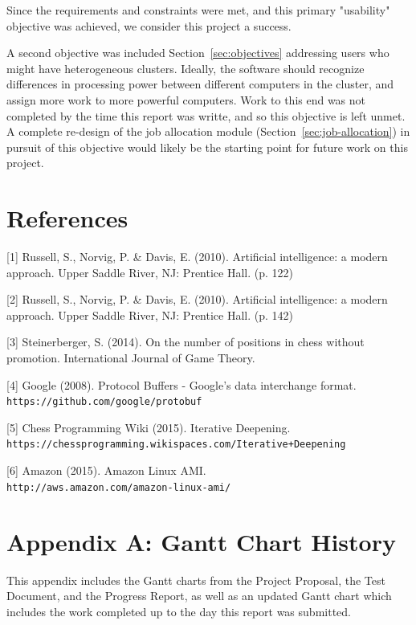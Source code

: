 \documentclass[pdftex,12pt,a4paper]{article}
\begin{document}
Since the requirements and constraints were met, and this primary "usability" objective was achieved, we consider this project a success. 

A second objective was included Section~\ref{sec:objectives} addressing users who might have heterogeneous clusters. Ideally, the software should recognize differences in processing power between different computers in the cluster, and assign more work to more powerful computers. Work to this end was not completed by the time this report was writte, and so this objective is left unmet. A complete re-design of the job allocation module (Section~\ref{sec:job-allocation}) in pursuit of this objective would likely be the starting point for future work on this project.

%
%
\pagebreak
\section{References}

[1] Russell, S., Norvig, P. \& Davis, E. (2010). Artificial intelligence: a modern approach. Upper Saddle River, NJ: Prentice Hall. (p. 122)

[2] Russell, S., Norvig, P. \& Davis, E. (2010). Artificial intelligence: a modern approach. Upper Saddle River, NJ: Prentice Hall. (p. 142)

[3] Steinerberger, S. (2014). On the number of positions in chess without promotion. International Journal of Game Theory.

[4] Google (2008). Protocol Buffers - Google's data interchange format.\\ \texttt{https://github.com/google/protobuf }

[5] Chess Programming Wiki (2015). Iterative Deepening.\\ \texttt{https://chessprogramming.wikispaces.com/Iterative+Deepening}

[6] Amazon (2015). Amazon Linux AMI.\\ \texttt{http://aws.amazon.com/amazon-linux-ami/}


%
%
\pagebreak
\section{Appendix A: Gantt Chart History}

This appendix includes the Gantt charts from the Project Proposal, the Test Document, and the Progress Report, as well as an updated Gantt chart which includes the work completed up to the day this report was submitted.
\end{document}
